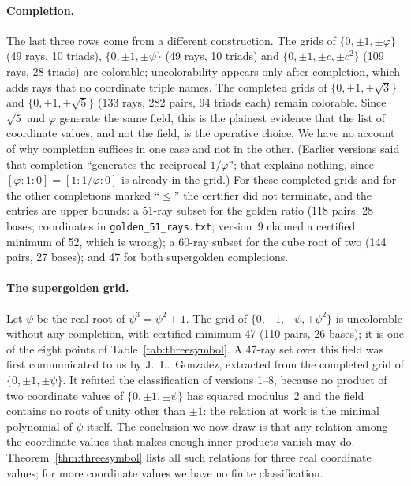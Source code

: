 \paragraph{Completion.}  The last three rows come from a different construction.  The grids
of $\{0,\pm1,\pm\varphi\}$ (49 rays, 10 triads), $\{0,\pm1,\pm\psi\}$ (49 rays, 10 triads) and
$\{0,\pm1,\pm c,\pm c^2\}$ (109 rays, 28 triads) are colorable; uncolorability appears only
after completion, which adds rays that no coordinate triple names.  The completed grids of
$\{0,\pm1,\pm\sqrt3\}$ and $\{0,\pm1,\pm\sqrt5\}$ (133 rays, 282 pairs, 94 triads each) remain
colorable.  Since $\sqrt5$ and $\varphi$ generate the same field, this is the plainest evidence
that the list of coordinate values, and not the field, is the operative choice.  We have no account of why
completion suffices in one case and not in the other.  (Earlier versions said that completion
``generates the reciprocal $1/\varphi$''; that explains nothing, since
$[\varphi:1:0]=[1:1/\varphi:0]$ is already in the grid.)  For these completed grids and for the other
completions marked ``$\le$'' the certifier did not terminate, and the entries are upper bounds:
a 51-ray subset for the golden ratio (118 pairs, 28 bases; coordinates in
\texttt{golden\_51\_rays.txt}; version~9 claimed a certified minimum of 52, which is wrong); a
60-ray subset for the cube root of two (144 pairs, 27 bases); and 47 for both supergolden
completions.

\paragraph{The supergolden grid.}  Let $\psi$ be the real root of $\psi^3=\psi^2+1$.  The
grid of $\{0,\pm1,\pm\psi,\pm\psi^2\}$ is uncolorable without any completion, with certified
minimum 47 (110 pairs, 26 bases); it is one of the eight points of Table~\ref{tab:threesymbol}.
A 47-ray set over this field was first communicated to us by J.~L.~Gonzalez, extracted from the
completed grid of $\{0,\pm1,\pm\psi\}$.  It refuted the classification of versions 1--8, because
no product of two coordinate values of $\{0,\pm1,\pm\psi\}$ has squared modulus~2 and the field contains no roots of unity other
than $\pm1$: the relation at work is the minimal polynomial of $\psi$ itself.  The conclusion we
now draw is that any relation among the coordinate values that makes enough inner products vanish may do.
Theorem~\ref{thm:threesymbol} lists all such relations for three real coordinate values; for more
coordinate values we have no finite classification.

